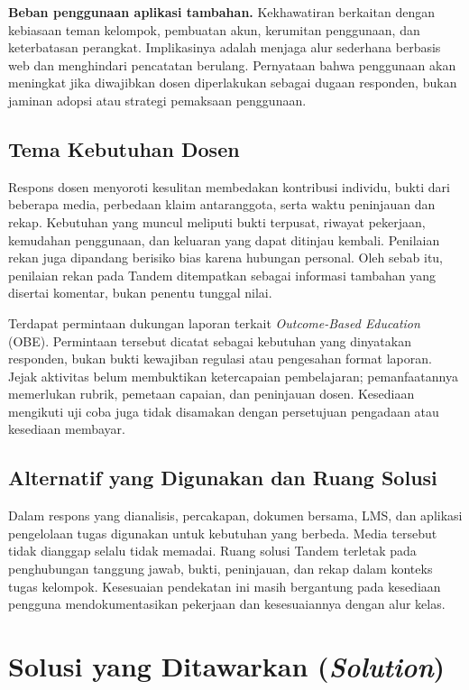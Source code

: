 \documentclass[12pt,a4paper,oneside]{report}
\begin{document}
\textbf{Beban penggunaan aplikasi tambahan.} Kekhawatiran berkaitan dengan kebiasaan teman kelompok, pembuatan akun, kerumitan penggunaan, dan keterbatasan perangkat. Implikasinya adalah menjaga alur sederhana berbasis web dan menghindari pencatatan berulang. Pernyataan bahwa penggunaan akan meningkat jika diwajibkan dosen diperlakukan sebagai dugaan responden, bukan jaminan adopsi atau strategi pemaksaan penggunaan.

\subsection{Tema Kebutuhan Dosen}
Respons dosen menyoroti kesulitan membedakan kontribusi individu, bukti dari beberapa media, perbedaan klaim antaranggota, serta waktu peninjauan dan rekap. Kebutuhan yang muncul meliputi bukti terpusat, riwayat pekerjaan, kemudahan penggunaan, dan keluaran yang dapat ditinjau kembali. Penilaian rekan juga dipandang berisiko bias karena hubungan personal. Oleh sebab itu, penilaian rekan pada Tandem ditempatkan sebagai informasi tambahan yang disertai komentar, bukan penentu tunggal nilai.

Terdapat permintaan dukungan laporan terkait \textit{Outcome-Based Education} (OBE). Permintaan tersebut dicatat sebagai kebutuhan yang dinyatakan responden, bukan bukti kewajiban regulasi atau pengesahan format laporan. Jejak aktivitas belum membuktikan ketercapaian pembelajaran; pemanfaatannya memerlukan rubrik, pemetaan capaian, dan peninjauan dosen. Kesediaan mengikuti uji coba juga tidak disamakan dengan persetujuan pengadaan atau kesediaan membayar.

\subsection{Alternatif yang Digunakan dan Ruang Solusi}
Dalam respons yang dianalisis, percakapan, dokumen bersama, LMS, dan aplikasi pengelolaan tugas digunakan untuk kebutuhan yang berbeda. Media tersebut tidak dianggap selalu tidak memadai. Ruang solusi Tandem terletak pada penghubungan tanggung jawab, bukti, peninjauan, dan rekap dalam konteks tugas kelompok. Kesesuaian pendekatan ini masih bergantung pada kesediaan pengguna mendokumentasikan pekerjaan dan kesesuaiannya dengan alur kelas.

\section{Solusi yang Ditawarkan (\textit{Solution})}
\end{document}
